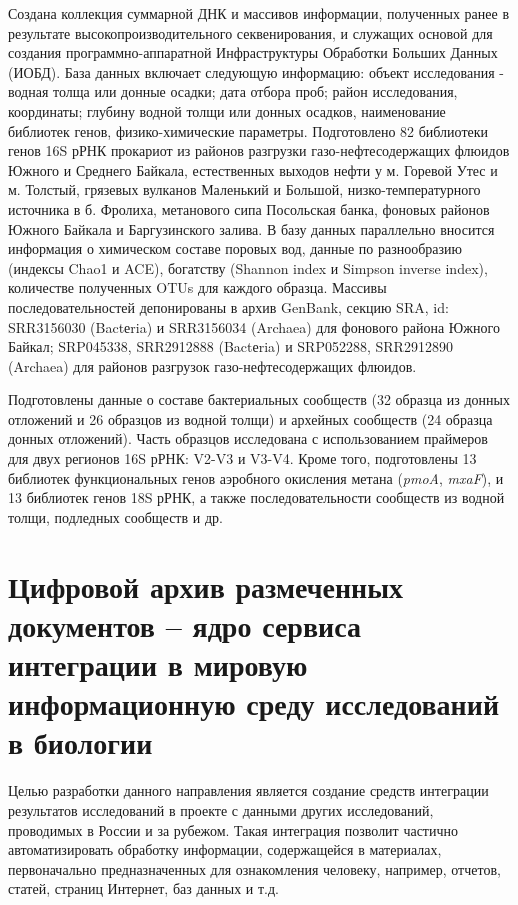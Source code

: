 \documentclass[a4paper,12pt,openany,final]{extreport}
\begin{document}
Создана коллекция суммарной ДНК и массивов информации, полученных ранее
в результате высокопроизводительного секвенирования, и служащих основой
для создания программно-аппаратной Инфраструктуры Обработки Больших
Данных (ИОБД). База данных включает следующую информацию: объект
исследования - водная толща или донные осадки; дата отбора проб; район
исследования, координаты; глубину водной толщи или донных осадков,
наименование библиотек генов, физико-химические параметры. Подготовлено
82 библиотеки генов 16S рРНК прокариот из районов разгрузки
газо-нефтесодержащих флюидов Южного и Среднего Байкала, естественных
выходов нефти у м. Горевой Утес и м. Толстый, грязевых вулканов
Маленький и Большой, низко-температурного источника в б. Фролиха,
метанового сипа Посольская банка, фоновых районов Южного Байкала и
Баргузинского залива. В базу данных параллельно вносится информация о
химическом составе поровых вод, данные по разнообразию (индексы Chao1 и
ACE), богатству (Shannon index и Simpson inverse index), количестве
полученных OTUs для каждого образца. Массивы последовательностей
депонированы в архив GenBank, секцию SRA, id: SRR3156030 (Bactеria) и
SRR3156034 (Archaea) для фонового района Южного Байкал; SRP045338,
SRR2912888 (Bactеria) и SRP052288, SRR2912890 (Archaea) для районов
разгрузок газо-нефтесодержащих флюидов.

Подготовлены данные о составе бактериальных сообществ (32 образца из
донных отложений и 26 образцов из водной толщи) и архейных сообществ (24
образца донных отложений). Часть образцов исследована с использованием
праймеров для двух регионов 16S рРНК: V2-V3 и V3-V4. Кроме того,
подготовлены 13 библиотек функциональных генов аэробного окисления
метана (\emph{pmoA}, \emph{mxaF}), и 13 библиотек генов 18S рРНК, а также последовательности сообществ из водной
толщи, подледных сообществ и др.

\chapter{Цифровой архив размеченных документов -- ядро
сервиса интеграции в мировую информационную среду исследований в
биологии}\label{chap:7}

Целью разработки данного направления является создание средств
интеграции результатов исследований в проекте с данными других
исследований, проводимых в России и за рубежом. Такая интеграция
позволит частично автоматизировать обработку информации, содержащейся в
материалах, первоначально предназначенных для ознакомления человеку,
например, отчетов, статей, страниц Интернет, баз данных и т.д.
\end{document}
